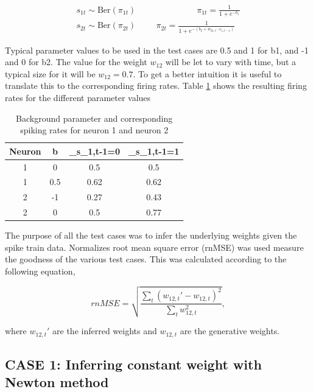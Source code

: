 \begin{equation}
\begin{split}
\label{Eq:TestCase}
    s_{1t} \sim \text{Ber}(\pi_{1t}) \hspace{3cm} \pi_{1t}= \frac{1}{1+e^{-b_1}} \\
    s_{2t} \sim \text{Ber}(\pi_{2t}) \hspace{1cm} \pi_{2t}= \frac{1}{1+e^{-(b_2 + w_{21,t} \cdot s_{1,t-1})}}
\end{split}
\end{equation}

Typical parameter values to be used in the test cases are 0.5 and 1 for b1, and -1 and 0 for b2. The value for the weight $w_{12}$ will be let to vary with time, but a typical size for it will be $w_{12}=0.7$. To get a better intuition it is useful to translate this to the corresponding firing rates. Table \ref{table:parameters} shows the resulting firing rates for the different parameter values


\begin{table}[!h]
\centering
\begin{tabular}{|c|c|c|c|}
	\hline
	Neuron & b & \pi_{s_{1,t-1}=0} & \pi_{s_{1,t-1}=1} \\
	\hline\hline
	1 & 0 & 0.5 & 0.5\\
	\hline
	1 & 0.5 & 0.62 & 0.62\\
	\hline
	2 & -1  & 0.27 & 0.43\\
	\hline
	2 & 0  & 0.5 & 0.77\\
	\hline
\end{tabular}
\caption{Background parameter and corresponding spiking rates for neuron 1 and neuron 2}
\label{table:parameters}
\end{table}

The purpose of all the test cases was to infer the underlying weights given the spike train data. Normalizes root mean square error (rnMSE) was used measure the goodness of the various test cases. This was calculated according to the following equation,

\begin{equation}
    rnMSE = \sqrt{\frac{\sum_t(w_{12,t}'-w_{12,t})^2}{\sum_t w_{12,t}^2}},
\end{equation}

where $w_{12,t}'$  are the inferred weights and $w_{12,t}$ are the generative weights.

\subsection{CASE 1: Inferring constant weight with Newton method}

